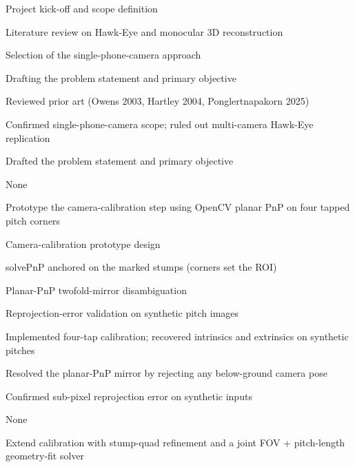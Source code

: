 \documentclass[12pt,a4paper]{report}
\begin{document}
%
{\begin{lblist}
\item Project kick-off and scope definition
\item Literature review on Hawk-Eye and monocular 3D reconstruction
\item Selection of the single-phone-camera approach
\item Drafting the problem statement and primary objective
\end{lblist}}%
{\begin{lblist}
\item Reviewed prior art (Owens 2003, Hartley 2004, Ponglertnapakorn 2025)
\item Confirmed single-phone-camera scope; ruled out multi-camera Hawk-Eye replication
\item Drafted the problem statement and primary objective
\end{lblist}}%
{\begin{lblist}\item None\end{lblist}}%
{\begin{lblist}\item Prototype the camera-calibration step using OpenCV planar PnP on four tapped pitch corners\end{lblist}}

%
{\begin{lblist}
\item Camera-calibration prototype design
\item solvePnP anchored on the marked stumps (corners set the ROI)
\item Planar-PnP twofold-mirror disambiguation
\item Reprojection-error validation on synthetic pitch images
\end{lblist}}%
{\begin{lblist}
\item Implemented four-tap calibration; recovered intrinsics and extrinsics on synthetic pitches
\item Resolved the planar-PnP mirror by rejecting any below-ground camera pose
\item Confirmed sub-pixel reprojection error on synthetic inputs
\end{lblist}}%
{\begin{lblist}\item None\end{lblist}}%
{\begin{lblist}\item Extend calibration with stump-quad refinement and a joint FOV + pitch-length geometry-fit solver\end{lblist}}
\end{document}
